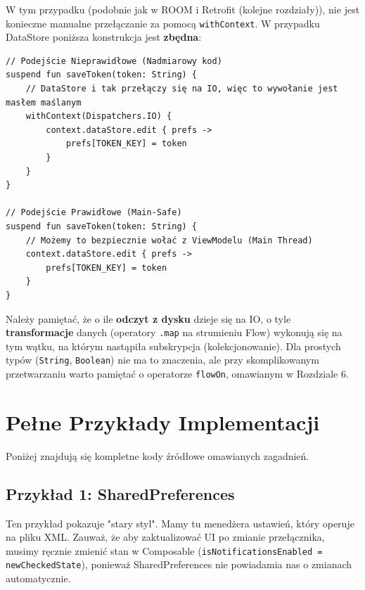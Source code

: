 W tym przypadku (podobnie jak w ROOM i Retrofit (kolejne rozdziały)), nie jest konieczne manualne przełączanie za pomocą \texttt{withContext}. W przypadku DataStore poniższa konstrukcja jest \textbf{zbędna}:

\begin{verbatim}
// Podejście Nieprawidłowe (Nadmiarowy kod)
suspend fun saveToken(token: String) {
    // DataStore i tak przełączy się na IO, więc to wywołanie jest masłem maślanym
    withContext(Dispatchers.IO) {
        context.dataStore.edit { prefs ->
            prefs[TOKEN_KEY] = token
        }
    }
}

// Podejście Prawidłowe (Main-Safe)
suspend fun saveToken(token: String) {
    // Możemy to bezpiecznie wołać z ViewModelu (Main Thread)
    context.dataStore.edit { prefs ->
        prefs[TOKEN_KEY] = token
    }
}
\end{verbatim}

Należy pamiętać, że o ile \textbf{odczyt z dysku} dzieje się na IO, o tyle \textbf{transformacje} danych (operatory \texttt{.map} na strumieniu Flow) wykonują się na tym wątku, na którym nastąpiła subskrypcja (kolekcjonowanie).
Dla prostych typów (\texttt{String}, \texttt{Boolean}) nie ma to znaczenia, ale przy skomplikowanym przetwarzaniu warto pamiętać o operatorze \texttt{flowOn}, omawianym w Rozdziale 6.

\section{Pełne Przykłady Implementacji}

Poniżej znajdują się kompletne kody źródłowe omawianych zagadnień.

\subsection{Przykład 1: SharedPreferences}

Ten przykład pokazuje "stary styl". Mamy tu menedżera ustawień, który operuje na pliku XML. Zauważ, że aby zaktualizować UI po zmianie przełącznika, musimy ręcznie zmienić stan w Composable (\texttt{isNotificationsEnabled = newCheckedState}), ponieważ SharedPreferences nie powiadamia nas o zmianach automatycznie.

